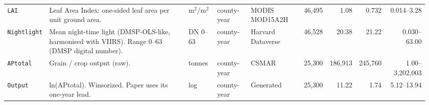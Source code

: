 \documentclass[10pt]{article}
\begin{document}
\begin{landscape}
{\begin{longtable}{>{\raggedright\arraybackslash}p{2.9cm}>{\raggedright\arraybackslash}p{8.0cm}>{\raggedright\arraybackslash}p{1.9cm}>{\raggedright\arraybackslash}p{1.7cm}>{\raggedright\arraybackslash}p{2.0cm}rrrr}
\texttt{LAI} & Leaf Area Index: one-sided leaf area per unit ground area. & m$^2$/m$^2$ & county-year & MODIS MOD15A2H & 46,495 & 1.08 & 0.732 & 0.014--3.28\\
\texttt{Nightlight} & Mean night-time light (DMSP-OLS-like, harmonised with VIIRS). Range 0--63 (DMSP digital number). & DN 0--63 & county-year & Harvard Dataverse & 46,528 & 20.38 & 21.22 & 0.030--63.00\\
\texttt{APtotal} & Grain / crop output (raw). & tonnes & county-year & CSMAR & 25,300 & 186,913 & 245,760 & 1.00--3,202,003\\
\texttt{Output} & ln(APtotal). Winsorized. Paper uses its one-year lead. & log & county-year & Generated & 25,300 & 11.22 & 1.74 & 5.12--13.94\\
\midrule
\end{longtable}
}
\end{landscape}

\end{document}
